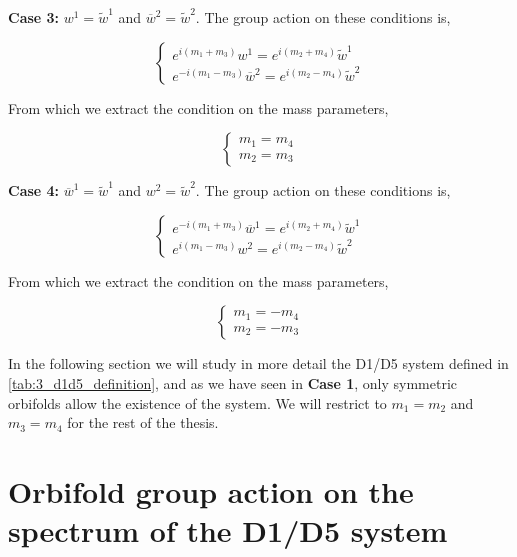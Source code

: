 \textbf{Case 3: } $w^1 = \tilde{w}^1$ and $\overline{w}^2 = \tilde{w}^2$. The group action on these conditions is,

\begin{equation}
    \begin{cases}
        e^{i(m_1 + m_3)} w^1 = e^{i(m_2 + m_4)} \tilde{w}^1 \\
        e^{-i(m_1 - m_3)} \overline{w}^2 = e^{i(m_2 - m_4)} \tilde{w}^2
    \end{cases}
\end{equation}

From which we extract the condition on the mass parameters,

\begin{equation}
    \begin{cases}
        m_1 = m_4 \\
        m_2 = m_3
    \end{cases}
\end{equation}

\textbf{Case 4: } $\overline{w}^1 = \tilde{w}^1$ and $w^2 = \tilde{w}^2$. The group action on these conditions is,

\begin{equation}
    \begin{cases}
        e^{-i(m_1 + m_3)} \overline{w}^1 = e^{i(m_2 + m_4)} \tilde{w}^1 \\
        e^{i(m_1 - m_3)} w^2 = e^{i(m_2 - m_4)} \tilde{w}^2
    \end{cases}
\end{equation}

From which we extract the condition on the mass parameters,

\begin{equation}
    \begin{cases}
        m_1 = -m_4 \\
        m_2 = -m_3
    \end{cases}
\end{equation}

In the following section we will study in more detail the D1/D5 system defined in \ref{tab:3_d1d5_definition}, and as we have seen in \textbf{Case 1}, only symmetric orbifolds allow the existence of the system. We will restrict to $m_1 = m_2$ and $m_3 = m_4$ for the rest of the thesis.

\section{Orbifold group action on the spectrum of the D1/D5 system}

